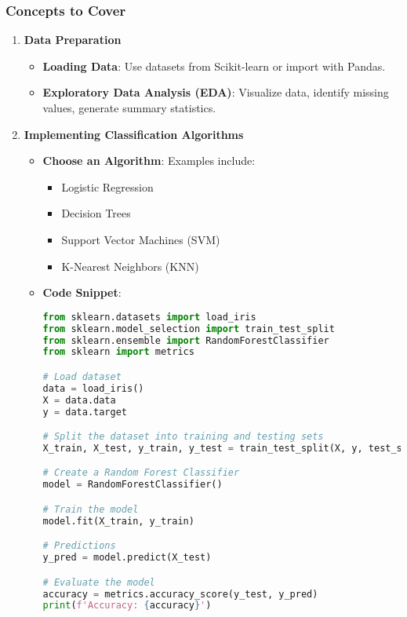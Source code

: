 \documentclass[aspectratio=169]{beamer}
\begin{document}
\begin{frame}[fragile]
    \frametitle{Concepts to Cover}
    \begin{enumerate}
        \item \textbf{Data Preparation}
        \begin{itemize}
            \item \textbf{Loading Data}: Use datasets from Scikit-learn or import with Pandas.
            \item \textbf{Exploratory Data Analysis (EDA)}: Visualize data, identify missing values, generate summary statistics.
        \end{itemize}
        
        \item \textbf{Implementing Classification Algorithms}
        \begin{itemize}
            \item \textbf{Choose an Algorithm}: Examples include:
            \begin{itemize}
                \item Logistic Regression
                \item Decision Trees
                \item Support Vector Machines (SVM)
                \item K-Nearest Neighbors (KNN)
            \end{itemize}
            \item \textbf{Code Snippet}:
            \begin{lstlisting}[language=Python]
from sklearn.datasets import load_iris
from sklearn.model_selection import train_test_split
from sklearn.ensemble import RandomForestClassifier
from sklearn import metrics

# Load dataset
data = load_iris()
X = data.data
y = data.target

# Split the dataset into training and testing sets
X_train, X_test, y_train, y_test = train_test_split(X, y, test_size=0.3, random_state=42)

# Create a Random Forest Classifier
model = RandomForestClassifier()

# Train the model
model.fit(X_train, y_train)

# Predictions
y_pred = model.predict(X_test)

# Evaluate the model
accuracy = metrics.accuracy_score(y_test, y_pred)
print(f'Accuracy: {accuracy}')
            \end{lstlisting}
        \end{itemize}
        

\end{enumerate}
\end{frame}
\end{document}
